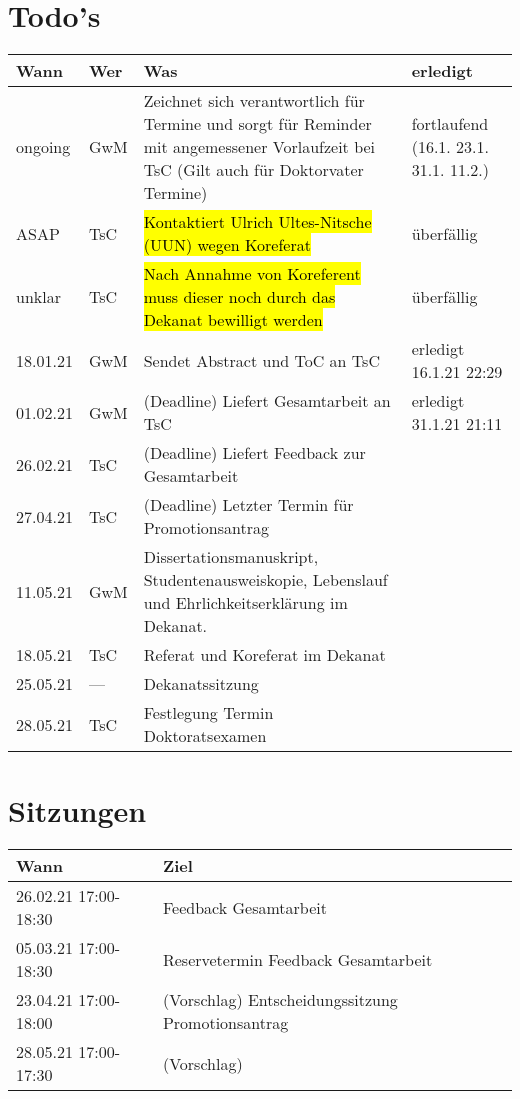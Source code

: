 \documentclass[a4paper,10pt,english]{extarticle}
\begin{document}
\section{Todo's}
\begin{tabular}{|l|l|l|p{5cm}|}\hline
	Wann & Wer & Was & erledigt\\\hline
	ongoing & GwM & Zeichnet sich verantwortlich für Termine und sorgt für Reminder mit angemessener Vorlaufzeit bei TsC (Gilt auch für Doktorvater Termine) &fortlaufend (16.1. 23.1. 31.1. 11.2.)\\
	ASAP    & TsC & \hl{Kontaktiert Ulrich Ultes-Nitsche (UUN) wegen Koreferat}                          & überfällig\\
	unklar  & TsC & \hl{Nach Annahme von Koreferent muss dieser noch durch das Dekanat bewilligt werden} & überfällig\\
	18.01.21& GwM & Sendet Abstract und ToC an TsC												         & erledigt 16.1.21 22:29\\
	01.02.21& GwM & (Deadline) Liefert Gesamtarbeit an TsC										         & erledigt 31.1.21 21:11\\
	26.02.21& TsC & (Deadline) Liefert Feedback zur Gesamtarbeit                                         &\\
	27.04.21& TsC & (Deadline) Letzter Termin für Promotionsantrag                                       &\\
	11.05.21& GwM & Dissertationsmanuskript, Studentenausweiskopie, Lebenslauf und Ehrlichkeitserklärung im Dekanat.&\\
	18.05.21& TsC & Referat und Koreferat im Dekanat                                                     &\\
	25.05.21& --- & Dekanatssitzung                                                                      &\\
	28.05.21& TsC & Festlegung Termin Doktoratsexamen                                                    &\\\hline
\end{tabular}

\section{Sitzungen}
\begin{tabular}{|l|l|}\hline
	Wann & Ziel \\\hline
	26.02.21 17:00-18:30 & Feedback Gesamtarbeit \\
	05.03.21 17:00-18:30 & Reservetermin Feedback Gesamtarbeit\\
	23.04.21 17:00-18:00 & (Vorschlag) Entscheidungssitzung Promotionsantrag\\
	28.05.21 17:00-17:30 & (Vorschlag)\\
	\hline
\end{tabular}
\end{document}

